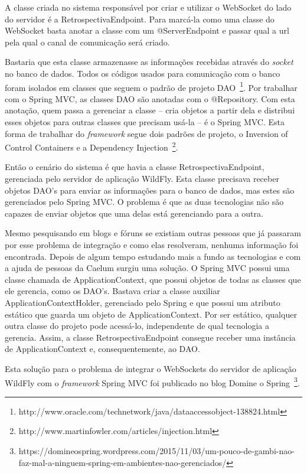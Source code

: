 A classe criada no sistema responsável por criar e utilizar o WebSocket do lado do servidor é a RetrospectivaEndpoint. Para marcá-la como uma classe do WebSocket basta anotar a classe com um @ServerEndpoint e passar qual a url pela qual o canal de comunicação será criado.

Bastaria que esta classe armazenasse as informações recebidas através do \textit{socket} no banco de dados. Todos os códigos usados para comunicação com o banco foram isolados em classes que seguem o padrão de projeto DAO~\footnote{http://www.oracle.com/technetwork/java/dataaccessobject-138824.html}. Por trabalhar com o Spring MVC, as classes DAO são anotadas com o @Repository. Com esta anotação, quem passa a gerenciar a classe -- cria objetos a partir dela e distribui esses objetos para outras classes que precisam usá-la -- é o Spring MVC. Esta forma de trabalhar do \textit{framework} segue dois padrões de projeto, o Inversion of Control Containers e a Dependency Injection~\footnote{http://www.martinfowler.com/articles/injection.html}.

Então o cenário do sistema é que havia a classe RetrospectivaEndpoint, gerenciada pelo servidor de aplicação WildFly. Esta classe precisava receber objetos DAO's para enviar as informações para o banco de dados, mas estes são gerenciados pelo Spring MVC. O problema é que as duas tecnologias não são capazes de enviar objetos que uma delas está gerenciando para a outra.

Mesmo pesquisando em blogs e fóruns se existiam outras pessoas que já passaram por esse problema de integração e como elas resolveram, nenhuma informação foi encontrada. Depois de algum tempo estudando mais a fundo as tecnologias e com a ajuda de pessoas da Caelum surgiu uma solução. O Spring MVC possui uma classe chamada de ApplicationContext, que possui objetos de todas as classes que ele gerencia, como os DAO's. Bastava criar a classe auxiliar ApplicationContextHolder, gerenciado pelo Spring e que possui um atributo estático que guarda um objeto de ApplicationContext. Por ser estático, qualquer outra classe do projeto pode acessá-lo, independente de qual tecnologia a gerencia. Assim, a classe RetrospectivaEndpoint consegue receber uma instância de ApplicationContext e, consequentemente, ao DAO.

Esta solução para o problema de integrar o WebSockets do servidor de aplicação WildFly com o \textit{framework} Spring MVC foi publicado no blog Domine o Spring~\footnote{https://domineospring.wordpress.com/2015/11/03/um-pouco-de-gambi-nao-faz-mal-a-ninguem-spring-em-ambientes-nao-gerenciados/}. 


